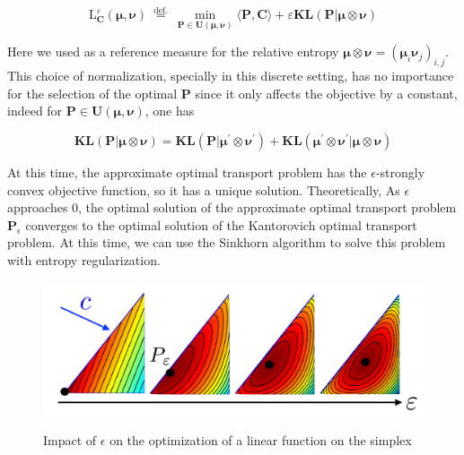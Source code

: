 \begin{equation}
  \label{eq:entropy_regularization}
  \mathrm{L}_{\mathbf{C}}^{\varepsilon}(\mathbf{\mu}, \mathbf{\nu}) \stackrel{\text { def. }}{=} \min _{\mathbf{P} \in \mathbf{U}(\mathbf{\mu}, \mathbf{\nu})}\langle\mathbf{P}, \mathbf{C}\rangle+\varepsilon \mathbf{K L}(\mathbf{P} | \mathbf{\mu} \otimes \mathbf{\nu})
\end{equation}

Here we used as a reference measure for the relative entropy $\mathbf{\mu} \otimes \mathbf{\nu}=\left(\mathbf{\mu}_{i} \mathbf{\nu}_{j}\right)_{i, j}$. This choice of normalization, specially in this discrete setting, has no importance for the selection of the optimal $\mathbf{P}$ since it only affects the objective by a constant, indeed for $\mathbf{P} \in \mathbf{U}(\mathbf{\mu}, \mathbf{\nu})$, one has 

\begin{equation}
  \mathbf{K L}(\mathbf{P} | \mathbf{\mu} \otimes \mathbf{\nu})=\mathbf{K} \mathbf{L}\left(\mathbf{P} | \mathbf{\mu}^{\prime} \otimes \mathbf{\nu}^{\prime}\right)+\mathbf{K} \mathbf{L}\left(\mathbf{\mu}^{\prime} \otimes \mathbf{\nu}^{\prime} | \mathbf{\mu} \otimes \mathbf{\nu}\right)
\end{equation}

At this time, the approximate optimal transport problem has the $\epsilon$-strongly convex objective function, so it has a unique solution. Theoretically, As $\epsilon$ approaches 0, the optimal solution of the approximate optimal transport problem $\mathbf{P}_{\epsilon}$ converges to the optimal solution of the Kantorovich optimal transport problem. At this time, we can use the Sinkhorn algorithm to solve this problem with entropy regularization.

\begin{figure}[htbp]
  \centering
  \includegraphics[width=0.9\linewidth]{img/regularized}
  \label{fig:regularized}
  \caption{Impact of $\epsilon$ on the optimization of a linear function on the simplex}
\end{figure}

